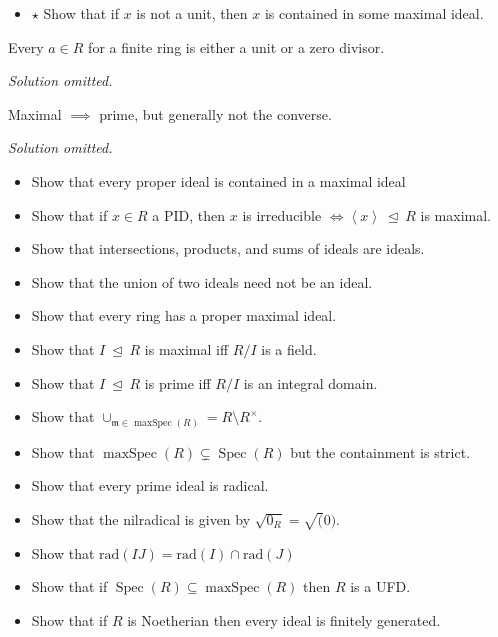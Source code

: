 \begin{itemize}
\tightlist
\item
  \(\star\) Show that if \(x\) is not a unit, then \(x\) is contained in
  some maximal ideal.
\end{itemize}

\begin{problem}

Every \(a\in R\) for a finite ring is either a unit or a zero divisor.

\end{problem}

\emph{Solution omitted.}

\begin{problem}

Maximal \(\implies\) prime, but generally not the converse.

\end{problem}

\emph{Solution omitted.}

\begin{itemize}
\tightlist
\item
  Show that every proper ideal is contained in a maximal ideal
\item
  Show that if \(x\in R\) a PID, then \(x\) is irreducible
  \(\iff \left\langle{x}\right\rangle{~\trianglelefteq~}R\) is maximal.
\item
  Show that intersections, products, and sums of ideals are ideals.
\item
  Show that the union of two ideals need not be an ideal.
\item
  Show that every ring has a proper maximal ideal.
\item
  Show that \(I{~\trianglelefteq~}R\) is maximal iff \(R/I\) is a field.
\item
  Show that \(I {~\trianglelefteq~}R\) is prime iff \(R/I\) is an
  integral domain.
\item
  Show that
  \(\cup_{{\mathfrak{m}}\in {\operatorname{maxSpec}}(R)} = R\setminus R^{\times}\).
\item
  Show that
  \({\operatorname{maxSpec}}(R) \subsetneq \operatorname{Spec}(R)\) but
  the containment is strict.
\item
  Show that every prime ideal is radical.
\item
  Show that the nilradical is given by \({\sqrt{0_{R}} } = \sqrt{(}0)\).
\item
  Show that \(\text{rad}(IJ) = \text{rad}(I) \cap\text{rad}(J)\)
\item
  Show that if
  \(\operatorname{Spec}(R) \subseteq {\operatorname{maxSpec}}(R)\) then
  \(R\) is a UFD.
\item
  Show that if \(R\) is Noetherian then every ideal is finitely
  generated.
\end{itemize}

